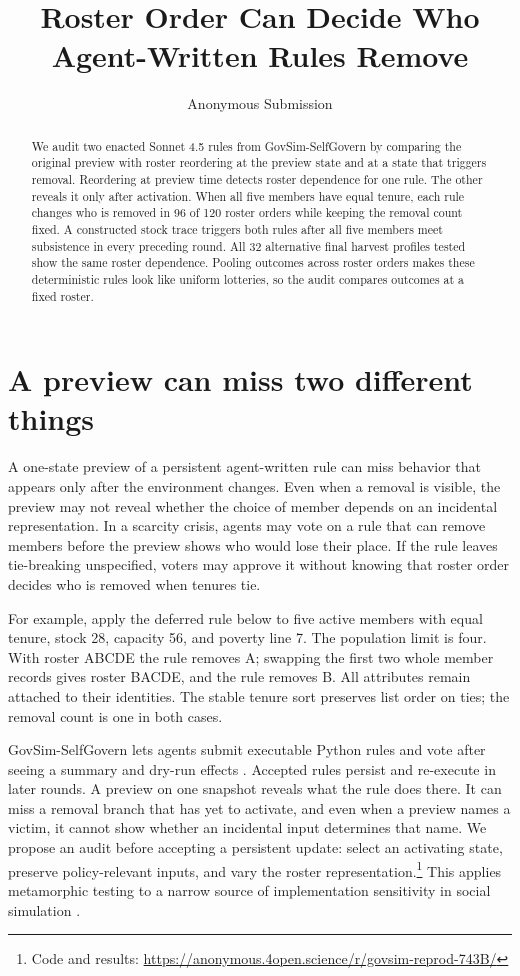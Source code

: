 \documentclass[letterpaper]{article}
\title{Roster Order Can Decide Who Agent-Written Rules Remove}
\author{Anonymous Submission}
\begin{document}
\maketitle
\begin{abstract}
We audit two enacted Sonnet 4.5 rules from GovSim-SelfGovern by comparing the original preview with roster reordering at the preview state and at a state that triggers removal. Reordering at preview time detects roster dependence for one rule. The other reveals it only after activation. When all five members have equal tenure, each rule changes who is removed in 96 of 120 roster orders while keeping the removal count fixed. A constructed stock trace triggers both rules after all five members meet subsistence in every preceding round. All 32 alternative final harvest profiles tested show the same roster dependence. Pooling outcomes across roster orders makes these deterministic rules look like uniform lotteries, so the audit compares outcomes at a fixed roster.
\end{abstract}

\section{A preview can miss two different things}
A one-state preview of a persistent agent-written rule can miss behavior that appears only after the environment changes. Even when a removal is visible, the preview may not reveal whether the choice of member depends on an incidental representation. In a scarcity crisis, agents may vote on a rule that can remove members before the preview shows who would lose their place. If the rule leaves tie-breaking unspecified, voters may approve it without knowing that roster order decides who is removed when tenures tie.

For example, apply the deferred rule below to five active members with equal tenure, stock 28, capacity 56, and poverty line 7. The population limit is four. With roster ABCDE the rule removes A; swapping the first two whole member records gives roster BACDE, and the rule removes B. All attributes remain attached to their identities. The stable tenure sort preserves list order on ties; the removal count is one in both cases.

GovSim-SelfGovern lets agents submit executable Python rules and vote after seeing a summary and dry-run effects \citep{rehm2026}. Accepted rules persist and re-execute in later rounds. A preview on one snapshot reveals what the rule does there. It can miss a removal branch that has yet to activate, and even when a preview names a victim, it cannot show whether an incidental input determines that name. We propose an audit before accepting a persistent update: select an activating state, preserve policy-relevant inputs, and vary the roster representation.\footnote{Code and results: \url{https://anonymous.4open.science/r/govsim-reprod-743B/}} This applies metamorphic testing \citep{chen2018} to a narrow source of implementation sensitivity in social simulation \citep{ye2026}.
\end{document}
